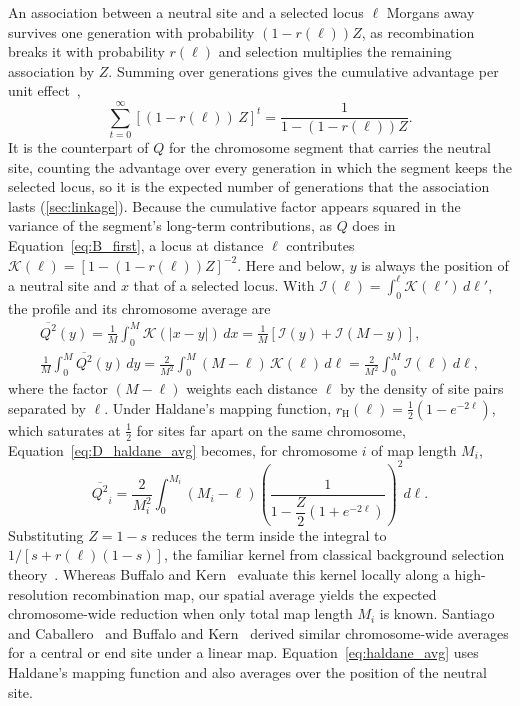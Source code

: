 \documentclass{article}
\begin{document}
An association between a neutral site and a selected locus $\ell$ Morgans away survives one generation with probability $(1 - r(\ell))Z$, as recombination breaks it with probability $r(\ell)$ and selection multiplies the remaining association by $Z$. Summing over generations gives the cumulative advantage per unit effect~\cite{santiago2016,buffaloKern2024},
\begin{equation}
    \sum_{t=0}^{\infty}\left[(1 - r(\ell))\,Z\right]^t = \frac{1}{1-(1-r(\ell))Z}.
\end{equation}
It is the counterpart of $Q$ for the chromosome segment that carries the neutral site, counting the advantage over every generation in which the segment keeps the selected locus, so it is the expected number of generations that the association lasts (\autoref{sec:linkage}). Because the cumulative factor appears squared in the variance of the segment's long-term contributions, as $Q$ does in Equation~\eqref{eq:B_first}, a locus at distance $\ell$ contributes $\mathcal{K}(\ell) = [1 - (1 - r(\ell))Z]^{-2}$. Here and below, $y$ is always the position of a neutral site and $x$ that of a selected locus. With $\mathcal{I}(\ell) = \int_0^\ell \mathcal{K}(\ell')\,d\ell'$, the profile and its chromosome average are
\begin{gather}
    \overline{Q^2}(y) = \frac{1}{M}\int_0^M \mathcal{K}(\vert x-y\vert)\,dx = \frac{1}{M}\left[\mathcal{I}(y) + \mathcal{I}(M-y)\right], \label{eq:D_profile} \\
    \frac{1}{M}\int_0^M \overline{Q^2}(y)\,dy = \frac{2}{M^2}\int_0^M (M-\ell)\,\mathcal{K}(\ell)\,d\ell = \frac{2}{M^2}\int_0^M \mathcal{I}(\ell)\,d\ell, \label{eq:D_haldane_avg}
\end{gather}
where the factor $(M - \ell)$ weights each distance $\ell$ by the density of site pairs separated by $\ell$. Under Haldane's mapping function, $r_\text{H}(\ell) = \tfrac12(1 - e^{-2\ell})$, which saturates at $\tfrac12$ for sites far apart on the same chromosome, Equation~\eqref{eq:D_haldane_avg} becomes, for chromosome $i$ of map length $M_i$,
\begin{equation}
    \overline{Q^2}_i = \frac{2}{M_i^2}\int_0^{M_i} (M_i - \ell)\left(\frac{1}{1 - \dfrac{Z}{2}(1 + e^{-2\ell})}\right)^2 d\ell. \label{eq:haldane_avg}
\end{equation}
Substituting $Z = 1 - s$ reduces the term inside the integral to $1/[s + r(\ell)(1-s)]$, the familiar kernel from classical background selection theory~\cite{hudson1995,nordborg1996,santiago1998,santiago2016,buffaloKern2024}. Whereas Buffalo and Kern~\cite{buffaloKern2024} evaluate this kernel locally along a high-resolution recombination map, our spatial average yields the expected chromosome-wide reduction when only total map length $M_i$ is known. Santiago and Caballero~\cite{santiago1998} and Buffalo and Kern~\cite[Supplementary Equations~32--33]{buffaloKern2024} derived similar chromosome-wide averages for a central or end site under a linear map. Equation~\eqref{eq:haldane_avg} uses Haldane's mapping function and also averages over the position of the neutral site.
\end{document}
